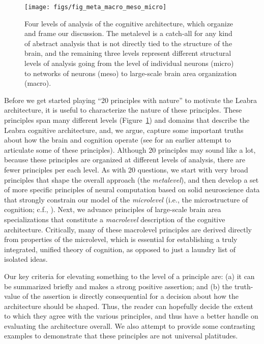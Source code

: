 \documentclass[11pt,twoside]{article}
\begin{document}
\begin{figure}
  \centering\texttt{[image: figs/fig\_meta\_macro\_meso\_micro]}
  \caption{\small Four levels of analysis of the cognitive architecture, which
    organize and frame our discussion.  The metalevel is a catch-all for any kind of abstract analysis that is not directly tied to the structure of the brain, and the remaining three levels represent different structural levels of analysis going from the level of individual neurons (micro) to networks of neurons (meso) to large-scale brain area organization (macro).}
  \label{fig.levels}
\end{figure}

Before we get started playing ``20 principles with nature'' to motivate the
Leabra architecture, it is useful to characterize the nature of these
principles.  These principles span many different levels
(Figure~\ref{fig.levels}) and domains that describe the Leabra cognitive
architecture, and, we argue, capture some important truths about how the brain
and cognition operate (see  for an earlier attempt to
articulate some of these principles).  Although 20 principles may sound like a
lot, because these principles are organized at different levels of analysis,
there are fewer principles per each level.  As with 20 questions, we start
with very broad principles that shape the overall approach (the {\em
  metalevel}), and then develop a set of more specific principles of neural
computation based on solid neuroscience data that strongly constrain our model
of the {\em microlevel} (i.e., the microstructure of cognition; c.f.,
).
Next, we advance principles of large-scale brain area specializations that
constitute a {\em macrolevel} description of the cognitive architecture.
Critically, many of these macrolevel principles are derived directly from
properties of the microlevel, which is essential for establishing a truly
integrated, unified theory of cognition, as opposed to just a laundry list of
isolated ideas.

Our key criteria for elevating something to the level of a principle are: (a)
it can be summarized briefly and makes a strong positive assertion; and (b)
the truth-value of the assertion is directly consequential for a decision
about how the architecture should be shaped.  Thus, the reader can hopefully
decide the extent to which they agree with the various principles, and thus
have a better handle on evaluating the architecture overall.  We also attempt
to provide some contrasting examples to demonstrate that these principles are
not universal platitudes.
\end{document}
